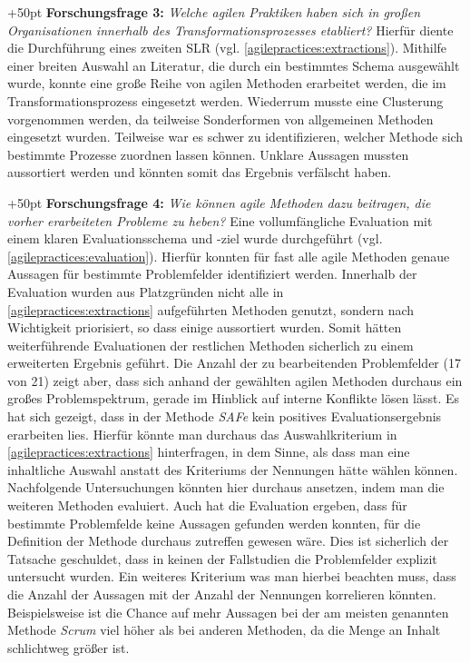 \hangindent+50pt 
\textbf{Forschungsfrage 3:} \textit{Welche agilen Praktiken haben sich in großen Organisationen innerhalb des Transformationsprozesses etabliert?
} Hierfür diente die Durchführung eines zweiten SLR (vgl. \ref{agilepractices:extractions}). Mithilfe einer breiten Auswahl an Literatur, die durch ein bestimmtes Schema ausgewählt wurde, konnte eine große Reihe von agilen Methoden erarbeitet werden, die im Transformationsprozess eingesetzt werden. Wiederrum musste eine Clusterung vorgenommen werden, da teilweise Sonderformen von allgemeinen Methoden eingesetzt wurden. Teilweise war es schwer zu identifizieren, welcher Methode sich bestimmte Prozesse zuordnen lassen können. Unklare Aussagen mussten aussortiert werden und könnten somit das Ergebnis verfälscht haben.

\hangindent+50pt 
\textbf{Forschungsfrage 4:} \textit{Wie können agile Methoden dazu beitragen, die vorher erarbeiteten Probleme zu heben?} Eine vollumfängliche Evaluation mit einem klaren Evaluationsschema und -ziel wurde durchgeführt (vgl. \ref{agilepractices:evaluation}). Hierfür konnten für fast alle agile Methoden genaue Aussagen für bestimmte Problemfelder identifiziert werden. Innerhalb der Evaluation wurden aus Platzgründen nicht alle in \\ \ref{agilepractices:extractions} aufgeführten Methoden genutzt, sondern nach Wichtigkeit priorisiert, so dass einige aussortiert wurden. Somit hätten weiterführende Evaluationen der restlichen Methoden sicherlich zu einem erweiterten Ergebnis geführt. Die Anzahl der zu bearbeitenden Problemfelder (17 von 21) zeigt aber, dass sich anhand der gewählten agilen Methoden durchaus ein großes Problemspektrum, gerade im Hinblick auf interne Konflikte lösen lässt. Es hat sich gezeigt, dass in der Methode \textit{SAFe} kein positives Evaluationsergebnis erarbeiten lies. Hierfür könnte man durchaus das Auswahlkriterium in \ref{agilepractices:extractions} hinterfragen, in dem Sinne, als dass man eine inhaltliche Auswahl anstatt des Kriteriums der Nennungen hätte wählen können. Nachfolgende Untersuchungen könnten hier durchaus ansetzen, indem man die weiteren Methoden evaluiert. Auch hat die Evaluation ergeben, dass für bestimmte Problemfelde keine Aussagen gefunden werden konnten, für die Definition der Methode durchaus zutreffen gewesen wäre. Dies ist sicherlich der Tatsache geschuldet, dass in keinen der Fallstudien die Problemfelder explizit untersucht wurden. Ein weiteres Kriterium was man hierbei beachten muss, dass die Anzahl der Aussagen mit der Anzahl der Nennungen korrelieren könnten. Beispielsweise ist die Chance auf mehr Aussagen bei der am meisten genannten Methode  \textit{Scrum} viel höher als bei anderen Methoden, da die Menge an Inhalt schlichtweg größer ist. 

